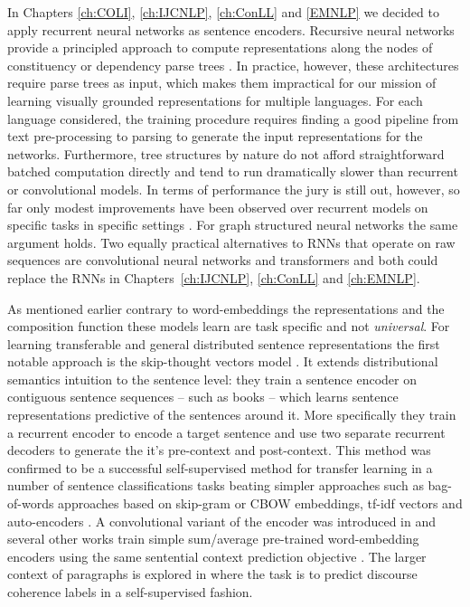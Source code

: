 In Chapters \ref{ch:COLI}, \ref{ch:IJCNLP}, \ref{ch:ConLL} and \ref{EMNLP} we decided to apply
recurrent neural networks as sentence encoders.
Recursive neural networks provide a principled approach to
compute representations along the nodes of constituency
or dependency parse trees \citep{socher2013recursive,socher2014grounded,le2015compositional,tai2015improved}.
In practice, however, these architectures require parse trees as input,
which makes them impractical for our mission of learning visually grounded
representations for multiple languages.
For each language considered, the training procedure requires finding a good
pipeline from text pre-processing to parsing to generate the input representations
for the networks. Furthermore, tree structures by nature do not
afford straightforward batched computation directly and tend to run dramatically
slower than recurrent or convolutional models. In terms of performance the jury
is still out, however, so far only modest improvements have been observed
over recurrent models on specific tasks in specific settings
\citep{li2015tree,tai2015improved}. For graph structured neural networks the
same argument holds. Two equally practical alternatives to RNNs
that operate on raw sequences are convolutional neural networks
\citep{bai2018empirical} and transformers \citep{vaswani2017attention} and both could
replace the RNNs in Chapters~\ref{ch:IJCNLP}, \ref{ch:ConLL} and \ref{ch:EMNLP}.


As mentioned earlier contrary to word-embeddings the representations
and the composition function these models learn are task specific and not \emph{universal}.
For learning transferable and general distributed sentence representations the
first notable approach is the
skip-thought vectors model \citep{kiros2015skip}.
It extends distributional semantics intuition to the sentence level:
they train a sentence encoder on contiguous sentence sequences
-- such as books -- which learns sentence representations predictive of the sentences around it.
More specifically
they train a recurrent encoder to encode a target sentence and use two separate recurrent decoders to
generate the it's pre-context and post-context.
This method was confirmed to be a successful self-supervised method for transfer
learning in a number of sentence
classifications tasks beating simpler approaches such as bag-of-words approaches based on skip-gram
or CBOW embeddings, tf-idf vectors and auto-encoders \citep{hill2016learning}. A convolutional
variant of the encoder was introduced in \cite{gan2016unsupervised} and several other works
train simple sum/average pre-trained word-embedding encoders using the same sentential
context prediction objective \citep{kenter2016siamese,hill2016learning}. The larger context of paragraphs is
explored in \cite{jernite2017discourse} where the task is to predict discourse coherence
labels in a self-supervised fashion.

